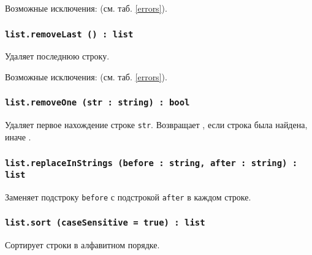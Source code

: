 Возможные исключения:  (см. таб. \ref{errors}).

\subsubsection{\texttt{list.removeLast () : list}}

Удаляет последнюю строку.

Возможные исключения:  (см. таб. \ref{errors}).

\subsubsection{\texttt{list.removeOne (str : string) : bool}}

Удаляет первое нахождение строке \texttt{str}. Возвращает \true, если строка была найдена, иначе \false.

\subsubsection{\texttt{list.replaceInStrings (before : string, after : string) : list}}

Заменяет подстроку \texttt{before} с подстрокой \texttt{after} в каждом строке.

\subsubsection{\texttt{list.sort (caseSensitive = true) : list}}

Сортирует строки в алфавитном порядке.

